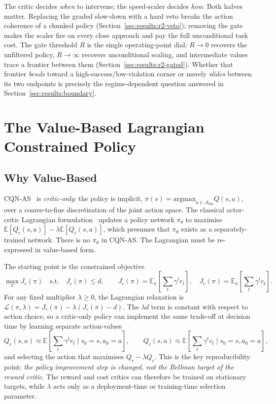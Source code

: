 \documentclass[11pt,a4paper]{report}
\newcommand{\cqnas}{CQN-AS}
\begin{document}
The critic decides \emph{when} to intervene; the speed-scaler decides
\emph{how}. Both halves matter. Replacing the graded
slow-down with a hard veto breaks the action coherence of a chunked
policy (Section~\ref{sec:results:r2-veto}); removing the gate makes
the scaler fire on every close approach and pay the full
unconditional task cost. The gate threshold $R$ is the single
operating-point dial: $R \to 0$ recovers the unfiltered policy,
$R \to \infty$ recovers unconditional scaling, and intermediate
values trace a frontier between them
(Section~\ref{sec:results:r2-gated}). Whether that frontier
\emph{bends} toward a high-success/low-violation corner or merely
\emph{slides} between its two endpoints is precisely the
regime-dependent question answered in
Section~\ref{sec:results:boundary}.

\section{The Value-Based Lagrangian Constrained Policy}
\label{sec:method:lagrangian}

\subsection{Why Value-Based}
\label{sec:method:lagrangian:why}

\cqnas{}~\cite{seo2024cqnas} is \emph{critic-only}: the policy is
implicit, $\pi(s) = \mathrm{argmax}_{a \in
\mathcal{A}_{\mathrm{bin}}} Q(s, a)$, over a coarse-to-fine
discretisation of the joint action space. The classical
actor-critic Lagrangian formulation~\cite{ray2019safetygym,
stooke2020pid} updates a policy network $\pi_\theta$ to maximise
$\mathbb{E}[Q_r(s,a)] - \lambda \mathbb{E}[Q_c(s,a)]$, which
presumes that $\pi_\theta$ exists as a separately-trained network.
There is no $\pi_\theta$ in \cqnas{}. The Lagrangian must be
re-expressed in value-based form.

The starting point is the constrained objective
\begin{equation}
  \max_{\pi} J_r(\pi)
  \quad \text{s.t.} \quad
  J_c(\pi) \le d,
  \qquad
  J_r(\pi)=\mathbb{E}_{\pi}\!\left[\sum_t \gamma^t r_t\right],
  \quad
  J_c(\pi)=\mathbb{E}_{\pi}\!\left[\sum_t \gamma^t c_t\right].
  \label{eq:cmdp-objective}
\end{equation}
For any fixed multiplier $\lambda \ge 0$, the Lagrangian relaxation is
$\mathcal{L}(\pi,\lambda)=J_r(\pi)-\lambda(J_c(\pi)-d)$. The
$\lambda d$ term is constant with respect to action choice, so a
critic-only policy can implement the same trade-off at decision time
by learning separate action-values
\[
Q_r(s,a)\approx\mathbb{E}\!\left[\sum_t\gamma^t r_t\mid s_0=s,a_0=a\right],
\qquad
Q_c(s,a)\approx\mathbb{E}\!\left[\sum_t\gamma^t c_t\mid s_0=s,a_0=a\right],
\]
and selecting the action that maximises $Q_r-\lambda Q_c$. This is the
key reproducibility point: \emph{the policy improvement step is changed,
not the Bellman target of the reward critic}. The reward and cost
critics can therefore be trained on stationary targets, while
$\lambda$ acts only as a deployment-time or training-time selection
parameter.
\end{document}
